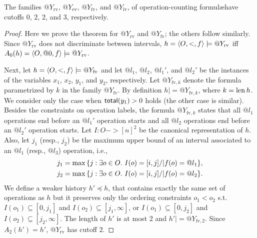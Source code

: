 \begin{theorem}
  \label{lem:cutoff}

  The families $@Y_\mathrm{rv}$, $@Y_\mathrm{ev}$, $@Y_\mathrm{fv}$, and
  $@Y_\mathrm{lv}$, of operation-counting formul\ae have cutoffs $0$, $2$, $2$,
  and $3$, respectively.

\end{theorem}

\begin{proof}

  Here we prove the theorem for $@Y_\mathrm{rv}$ and $@Y_\mathrm{fv}$; the
  others follow similarly. Since $@Y_\mathrm{rv}$ does not discriminate
  between intervals, $h = \left\langle {O,<,f} \right\rangle |= @Y_\mathrm{rv}$ if{f} $A_0(h) =
  \left\langle {O,@0,f} \right\rangle |= @Y_\mathrm{rv}$. %

  Next, let $h = \left\langle {O,<,f} \right\rangle |= @Y_\mathrm{fv}$ and let $@l_1$, $@l_2$,
  $@l_1'$, and $@l_2'$ be the instances of the variables $x_1$, $x_2$, $y_1$,
  and $y_2$, respectively. Let $@Y_{\mathrm{fv},k}$ denote the formula
  parametrized by $k$ in the family $@Y_\mathrm{fv}$. By definition $h |=
  @Y_{\mathrm{fv},k}$, where $k = \operatorname{len} h$. We consider only the case when
  $\mathsf{total}(y_1)>0$ holds (the other case is similar). Besides the constraints on
  operation labels, the formula $@Y_{\mathrm{fv},k}$ states that all $@l_1$
  operations end before an $@l_1'$ operation starts and all $@l_2$ operations
  end before an $@l_2'$ operation starts. Let $I:O->[n]^2$ be the canonical
  representation of $h$. Also, let $j_1$ (resp., $j_2$) be the maximum upper
  bound of an interval associated to an $@l_1$ (resp., $@l_3$) operation, i.e.,
  \begin{align*}
    j_1 = \max{\{ j:\exists o\in O.\ I(o) = [i,j] /| f(o)=@l_1 \}}, \\
    j_2 = \max{\{ j:\exists o\in O.\ I(o) = [i,j] /| f(o)=@l_2 \}}.
  \end{align*}
  We define a weaker history $h'\preceq h$, that contains exactly the same set
  of operations as $h$ but it preserves only the ordering constraints $o_1<o_2$
  s.t. $I(o_1)\subseteq [0,j_1]$ and $I(o_2)\subseteq [j_1,\infty]$, or
  $I(o_1)\subseteq [0,j_2]$ and $I(o_2)\subseteq [j_2,\infty]$. The length of
  $h'$ is at most 2
  and $h'|= @Y_{\mathrm{fv},2}$. Since $A_2(h') = h'$, $@Y_\mathrm{rv}$ has
  cutoff $2$.
\end{proof}


